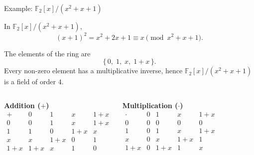 \documentclass[aspectratio=169,xcolor=dvipsnames]{beamer}
\begin{document}
	\begin{frame}{Example: $\mathbb{F}_{2}[x]/(x^2 + x + 1)$}
		\begin{alertblock}{}
			In $\mathbb{F}_{2}[x]/(x^2 + x + 1)$,
			\[
			(x+1)^2 = x^2 + 2x + 1 \equiv x \pmod{x^2 + x + 1}.
			\]
		\end{alertblock}
		\begin{alertblock}{}
			The elements of the ring are
			\[
			\{\,0,\;1,\;x,\;1+x\,\}.
			\]
			Every non-zero element has a multiplicative inverse, hence
			$\mathbb{F}_{2}[x]/(x^2 + x + 1)$ is a \alert{field} of order $4$.
			
			\vspace{0.6em}
			
			\begin{columns}[c]
				\centering
				\textbf{Addition ($+$)}
				\[
				\begin{array}{c|cccc}
					+ & 0 & 1 & x & 1+x \\ \hline
					0 & 0 & 1 & x & 1+x \\
					1 & 1 & 0 & 1+x & x \\
					x & x & 1+x & 0 & 1 \\
					1+x & 1+x & x & 1 & 0
				\end{array}
				\]
				
				\centering
				\textbf{Multiplication ($\cdot$)}
				\[
				\begin{array}{c|cccc}
					\cdot & 0 & 1 & x & 1+x \\ \hline
					0 & 0 & 0 & 0 & 0 \\
					1 & 0 & 1 & x & 1+x \\
					x & 0 & x & 1+x & 1 \\
					1+x & 0 & 1+x & 1 & x
				\end{array}
				\]
			\end{columns}
			
		\end{alertblock}
		
	\end{frame}
	
\end{document}
